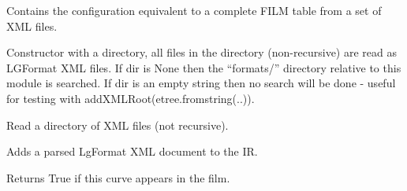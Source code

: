 \documentclass[letterpaper,10pt,english]{sphinxmanual}
\begin{document}
\begin{fulllineitems}
\label{\detokenize{ref/util/plot/FILMCfgXML:TotalDepth.util.plot.FILMCfgXML.FilmCfgXMLRead}}
Contains the configuration equivalent to a complete FILM table from a set of XML files.

\begin{fulllineitems}
\label{\detokenize{ref/util/plot/FILMCfgXML:TotalDepth.util.plot.FILMCfgXML.FilmCfgXMLRead.__init__}}
Constructor with a directory, all files in the directory (non-recursive)
are read as LGFormat XML files. If dir is None then the “formats/” directory
relative to this module is searched. If dir is an empty string then no search
will be done - useful for testing with addXMLRoot(etree.fromstring(..)).

\end{fulllineitems}


\begin{fulllineitems}
\label{\detokenize{ref/util/plot/FILMCfgXML:TotalDepth.util.plot.FILMCfgXML.FilmCfgXMLRead.readDir}}
Read a directory of XML files (not recursive).

\end{fulllineitems}


\begin{fulllineitems}
\label{\detokenize{ref/util/plot/FILMCfgXML:TotalDepth.util.plot.FILMCfgXML.FilmCfgXMLRead.addXMLRoot}}
Adds a parsed LgFormat XML document to the IR.

\end{fulllineitems}


\begin{fulllineitems}
\label{\detokenize{ref/util/plot/FILMCfgXML:TotalDepth.util.plot.FILMCfgXML.FilmCfgXMLRead.chOutpMnemInFilmId}}
Returns True if this curve appears in the film.


\end{fulllineitems}
\end{fulllineitems}
\end{document}
